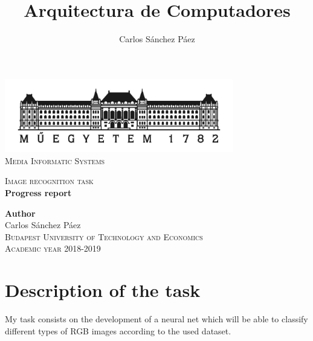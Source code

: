 \documentclass[12pt,spanish]{article}
\title{Arquitectura de Computadores}
\author{Carlos Sánchez Páez}
\begin{document}
\begin{titlepage}

\newlength{\centeroffset}
\setlength{\centeroffset}{-0.5\oddsidemargin}
\addtolength{\centeroffset}{0.5\evensidemargin}
\thispagestyle{empty}

\noindent\hspace*{\centeroffset}
\begin{minipage}{\textwidth}

\centering
\includegraphics[width=0.75\textwidth]{bme_logo.jpg}\\[1.4cm]

\textsc{ \Large Media Informatic Systems\\[4cm]}

\textsc{\Huge Image recognition task}\\[0.75cm]

{\Large\bfseries Progress report\\}
\end{minipage}

\vspace{8cm}
\noindent\hspace*{\centeroffset}
\begin{minipage}{\textwidth}
\centering

\textbf{Author}\\ {Carlos Sánchez Páez}\\[1cm]
\textsc{Budapest University of Technology and Economics}\\
\vspace{1cm}
\textsc{Academic year 2018-2019}
\end{minipage}
\end{titlepage}
\thispagestyle{empty}
\newpage
\tableofcontents{}
\listoffigures
\thispagestyle{empty}
\newpage

\section{Description of the task}

My task consists on the development of a neural net which will be able to classify different types of RGB images according to the used dataset.
\end{document}
